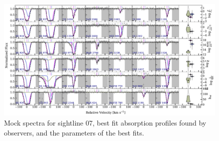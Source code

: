 \documentclass[fleqn,usenatbib]{mnras}
\begin{document}
\begin{figure}
    \centering
    \includegraphics[width=\textwidth]{figures/sample2/best_fits/0007.pdf}
    \caption{
    Mock spectra for sightline 07,
    best fit absorption profiles found by observers,
    and the parameters of the best fits.
    }
    \label{f: sample2 spectrum 07}
\end{figure}
\end{document}
